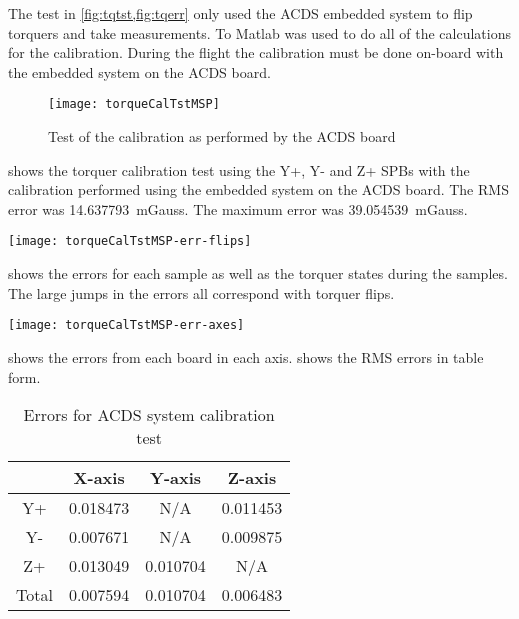 The test in \cref{fig:tqtst,fig:tqerr} only used the \ac{ACDS} embedded system to flip torquers and take measurements. To Matlab was used to do all of the calculations for the calibration. During the flight the calibration must be done on-board with the embedded system on the \ac{ACDS} board.

\begin{figure}[!ht]
    \centering
    \texttt{[image: torqueCalTstMSP]}
    \caption{Test of the calibration as performed by the \ac{ACDS} board}
    \label{fig:tcalMSP}
\end{figure}

 shows the torquer calibration test using the Y+, Y- and Z+ \acp{SPB} with the calibration performed using the embedded system on the \ac{ACDS} board. The RMS error was 14.637793~mGauss. The maximum error was 39.054539~mGauss.

\begin{sidewaysfigure}
    \centering
    \texttt{[image: torqueCalTstMSP-err-flips]}
    \caption{Error plot for \cref{fig:tcalMSP} showing torquer states}
    \label{fig:tcalMSPerr}
\end{sidewaysfigure}

 shows the errors for each sample as well as the torquer states during the samples. The large jumps in the errors all correspond with torquer flips.

\begin{sidewaysfigure}
    \centering
    \texttt{[image: torqueCalTstMSP-err-axes]}
    \caption{Plot of magnetic field errors for each axis}
    \label{fig:tcalMSPerr-axis}
\end{sidewaysfigure}

 shows the errors from each board in each axis.  shows the RMS errors in table form.

\begin{table}[!ht]
    \centering
    \caption{Errors for \ac{ACDS} system calibration test}
    \label{tab:tcalMSPerr}
    \begin{tabular}{|c|c|c|c|}
        \hline
        &X-axis&Y-axis&Z-axis\\
        \hline
        Y+&0.018473&N/A&0.011453\\
        \hline
        Y-&0.007671&N/A&0.009875\\
        \hline
        Z+&0.013049&0.010704&N/A\\
        \hline
        Total&0.007594&0.010704&0.006483\\
        \hline
    \end{tabular}
\end{table}

